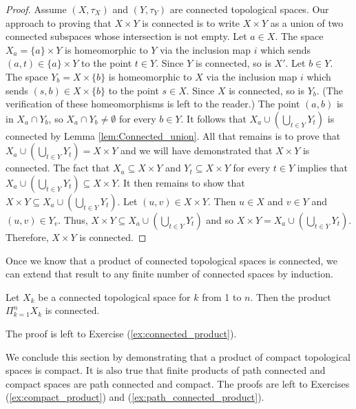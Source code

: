 \begin{proof} Assume $(X, \tau_X)$ and $(Y, \tau_Y)$ are connected topological spaces. Our approach to proving that $X \times Y$ is connected is to write $X \times Y$ as a union of two connected subspaces whose intersection is not empty. Let $a \in X$. The space $X_a = \{a\} \times Y$ is homeomorphic to $Y$ via the inclusion map $i$ which sends $(a,t) \in \{a\} \times Y$ to the point $t \in Y$. Since $Y$ is connected, so is $X'$. Let $b \in Y$. The space $Y_b = X \times \{b\}$ is homeomorphic to $X$ via the inclusion map $i$ which sends $(s,b) \in X \times \{b\}$ to the point $s \in X$. Since $X$ is connected, so is $Y_b$. (The verification of these homeomorphisms is left to the reader.) The point $(a,b)$ is in $X_a \cap Y_b$, so $X_a \cap Y_b \neq \emptyset$ for every $b \in Y$. It follows that $X_a \cup \left( \bigcup_{t \in Y} Y_t \right)$ is connected by Lemma \ref{lem:Connected_union}. All that remains is to prove that $X_a \cup \left( \bigcup_{t \in Y} Y_t \right) = X \times Y$ and we will have demonstrated that $X \times Y$ is connected.  The fact that $X_a \subseteq X \times Y$ and $Y_t \subseteq X \times Y$ for every $t \in Y$ implies that $X_a \cup \left( \bigcup_{t \in Y} Y_t \right) \subseteq X \times Y$. It then remains to show that $X \times Y \subseteq X_a \cup \left( \bigcup_{t \in Y} Y_t \right)$. Let $(u,v) \in X \times Y$. Then $u \in X$ and $v \in Y$ and $(u,v) \in Y_v$. Thus, $X \times Y \subseteq X_a \cup \left( \bigcup_{t \in Y} Y_t \right)$ and so $X \times Y = X_a \cup \left( \bigcup_{t \in Y} Y_t \right)$. Therefore, $X \times Y$ is connected.  
\end{proof}

Once we know that a product of connected topological spaces is connected, we can extend that result to any finite number of connected spaces by induction.

\begin{corollary} Let $X_{k}$ be a connected topological space for $k$ from 1 to $n$. Then the product $\Pi_{k=1}^n X_k$ is connected.
\end{corollary}

The proof is left to Exercise (\ref{ex:connected_product}). 

We conclude this section by demonstrating that a product of compact topological spaces is compact. It is also true that finite products of path connected and compact spaces are path connected and compact. The proofs are left to Exercises (\ref{ex:compact_product}) and (\ref{ex:path_connected_product}). 
 
